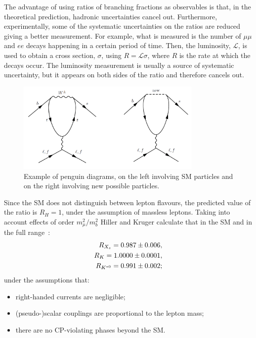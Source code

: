 
The advantage of using ratios of branching fractions as observables is that, in the theoretical prediction, hadronic 
uncertainties cancel out. Furthermore, experimentally, some of the systematic uncertainties on the ratios are reduced
giving a better measurement. For example, what is measured is the number of $\mu\mu$ and $ee$ decays 
happening in a certain period of time. Then, the luminosity, $\mathcal{L}$, is used to obtain a
cross section, $\sigma$, using $R = \mathcal{L}\sigma$, where $R$ is the rate at which the decays occur. 
The luminosity measurement is usually a source of systematic uncertainty, but it appears on both
sides of the ratio and therefore cancels out.

\begin{figure}[h]
\centering \includegraphics[width=0.8\textwidth]{RKst/figs/penguins.png}
\caption{Example of penguin diagrams, on the left involving SM particles and on the right 
involving new possible particles.}
\label{fig:NPpenguins}
\end{figure}

Since the SM does not distinguish between lepton flavours, the predicted value of the ratio 
is $R_H = 1$, under the assumption of massless leptons. Taking into account effects of order 
$m_\mu^2 / m_b^2$ Hiller and Kruger calculate that in the SM and in the full \qsq range~\cite{Hiller:2003js}:
%
\begin{align}
R_{X_s} = 0.987 \pm 0.006, \\
R_K = 1.0000 \pm 0.0001, \\
R_{{{K}^{*0}}} = 0.991 \pm 0.002; \\
\end{align}
%
\noindent
under the assumptions that:
%
\begin{itemize}
\item right-handed currents are negligible;
\item (pseudo-)scalar couplings are proportional to the lepton mass;
\item there are no CP-violating phases beyond the SM.
\end{itemize}

